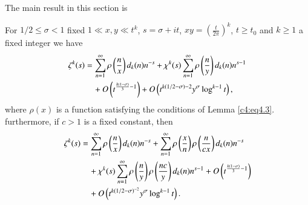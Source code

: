 The main result in this section is 
\begin{thm}\label{c4:thm4.2}
  For $1/2\leq \sigma < 1$ fixed $1 \ll x, y \ll t^k$, $s= \sigma +
  it$, $xy = \left( \frac{t}{2 \pi}\right)^k$, $t \geq t_0$ and $k
  \geq 1$ a fixed integer we have
  \begin{align}
    \zeta^k (s) & = \sum_{n=1}^\infty \rho \left(\frac{n}{x} \right)
    d_k (n) n^{-s} + \chi^k(s) \sum_{n=1}^\infty \rho
    \left(\frac{n}{y} \right) d_k (n) n^{s-1}\label{c4:eq4.25}\\
    &\quad+ O \left(t^{\frac{k(1-\sigma)}{3}-1} \right)+
    O\left(t^{k(1/2-\sigma)-2} y^\sigma \log^{k-1}t\right),\notag
  \end{align}
  where $\rho(x)$ is a function satisfying the conditions of Lemma
  \eqref{c4:eq4.3}. furthermore, if $c> 1$ is a fixed constant, then
  \begin{align}
    \zeta^k (s) & = \sum_{n=1}^\infty \rho \left(\frac{n}{x}
    \right)d_k (n) n^{-s} + \sum_{n=1}^\infty \rho
    \left(\frac{x}{n}\right)\rho \left(\frac{n}{cx} \right)d_k (n)
    n^{-s}\label{c4:eq4.26}\\
    &\quad + \chi^k (s) \sum_{n=1}^\infty \rho \left( \frac{n}{y}\right)
    \rho \left(\frac{nc}{y} \right)d_k (n) n^{s-1} + O
    \left(t^{\frac{k (1- \sigma)}{3} -1} \right)\notag \\
    &\quad + O \left(t^{k (1/2 -\sigma)^{-2}} y^\sigma \log^{k-1}t \right).\notag
  \end{align}
\end{thm}

